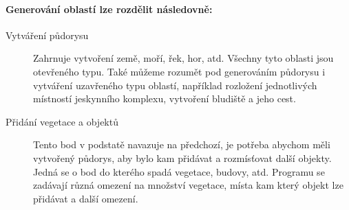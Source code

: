 \pagebreak
\paragraph*{Generování oblastí lze rozdělit následovně:}
\begin{description}
	\item[Vytváření půdorysu] Zahrnuje vytvoření země, moří, řek, hor, atd. Všechny tyto oblasti jsou otevřeného typu. Také můžeme rozumět pod generováním půdorysu i vytváření uzavřeného typu oblastí, například rozložení jednotlivých místností jeskynního komplexu, vytvoření bludiště a jeho cest. 
	
	\item[Přidání vegetace a objektů] Tento bod v podstatě navazuje na předchozí, je potřeba abychom měli vytvořený půdorys, aby bylo kam přidávat a rozmísťovat další objekty. Jedná se o bod do kterého spadá vegetace, budovy, atd. Programu se zadávají různá omezení na množství vegetace, místa kam který objekt lze přidávat a další omezení.
\end{description} 

